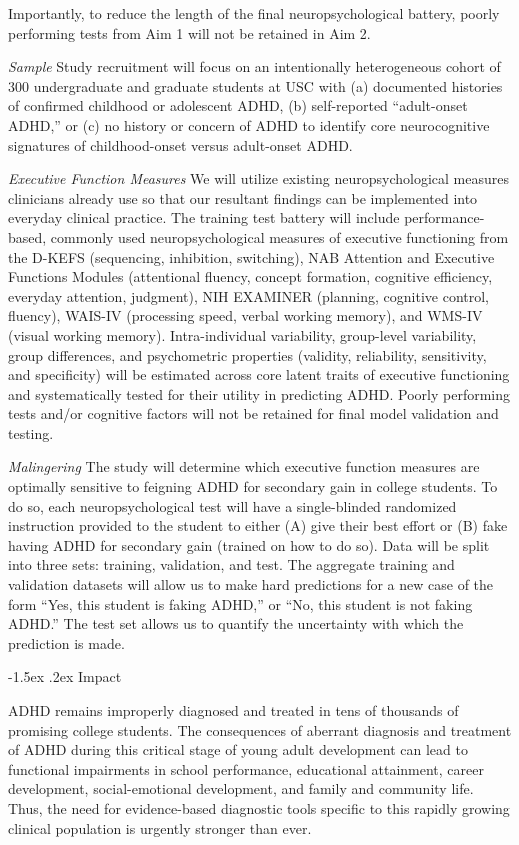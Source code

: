 \documentclass[11pt,]{article}
\makeatletter
\renewcommand\paragraph{
  \@startsection{paragraph}{4}{\z@}
    {-0.5ex\@plus -1ex \@minus -.2ex}%
    {-1.5ex \@plus .2ex}%
    {\normalfont\normalsize\bf}} %
\makeatother
\begin{document}
Importantly, to reduce the length of the final neuropsychological
battery, poorly performing tests from Aim 1 will not be retained in Aim
2.

\emph{Sample} Study recruitment will focus on an intentionally
heterogeneous cohort of 300 undergraduate and graduate students at USC
with (a) documented histories of confirmed childhood or adolescent ADHD,
(b) self-reported ``adult-onset ADHD,'' or (c) no history or concern of
ADHD to identify core neurocognitive signatures of childhood-onset
versus adult-onset ADHD.

\emph{Executive Function Measures} We will utilize existing
neuropsychological measures clinicians already use so that our resultant
findings can be implemented into everyday clinical practice. The
training test battery will include performance-based, commonly used
neuropsychological measures of executive functioning from the D-KEFS
(sequencing, inhibition, switching), NAB Attention and Executive
Functions Modules (attentional fluency, concept formation, cognitive
efficiency, everyday attention, judgment), NIH EXAMINER (planning,
cognitive control, fluency), WAIS-IV (processing speed, verbal working
memory), and WMS-IV (visual working memory). Intra-individual
variability, group-level variability, group differences, and
psychometric properties (validity, reliability, sensitivity, and
specificity) will be estimated across core latent traits of executive
functioning and systematically tested for their utility in predicting
ADHD. Poorly performing tests and/or cognitive factors will not be
retained for final model validation and testing.

\emph{Malingering} The study will determine which executive function
measures are optimally sensitive to feigning ADHD for secondary gain in
college students. To do so, each neuropsychological test will have a
single-blinded randomized instruction provided to the student to either
(A) give their best effort or (B) fake having ADHD for secondary gain
(trained on how to do so). Data will be split into three sets: training,
validation, and test. The aggregate training and validation datasets
will allow us to make hard predictions for a new case of the form ``Yes,
this student is faking ADHD,'' or ``No, this student is not faking
ADHD.'' The test set allows us to quantify the uncertainty with which
the prediction is made.

\hypertarget{impact}{%
\paragraph{Impact}\label{impact}}

ADHD remains improperly diagnosed and treated in tens of thousands of
promising college students. The consequences of aberrant diagnosis and
treatment of ADHD during this critical stage of young adult development
can lead to functional impairments in school performance, educational
attainment, career development, social-emotional development, and family
and community life. Thus, the need for evidence-based diagnostic tools
specific to this rapidly growing clinical population is urgently
stronger than ever.


\end{document}
